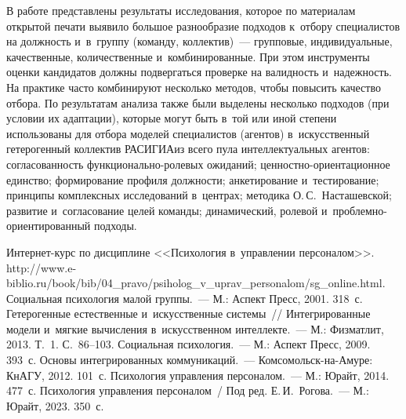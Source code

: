 \begin{multicols}{2}
  В работе представлены результаты исследования, которое по материалам 
открытой печати выявило большое разнообразие подходов к~отбору 
специалистов на долж\-ность и~в~группу (команду, коллектив)~--- групповые, 
индивидуальные, качественные, количественные и~комбинированные. При этом 
инструменты оценки кандидатов должны подвергаться проверке на ва\-лид\-ность
 и~на\-деж\-ность. На практике часто комбинируют несколько методов, чтобы 
повысить качество отбора. По результатам анализа так\-же были выделены 
несколько подходов (при условии их адаптации), которые могут быть в~той или 
иной степени использованы для отбора моделей специалистов (агентов) 
в~искусственный гетерогенный коллектив \mbox{РАСИГИА}\linebreak из всего пула 
интеллектуальных агентов: со\-гла\-со\-ван\-ность функ\-цио\-наль\-но-ро\-ле\-вых 
ожиданий; цен\-ност\-но-ори\-ен\-та\-ци\-он\-ное единство; формирование\linebreak 
профиля долж\-ности; анкетирование и~тес\-ти\-ро\-ва\-ние; принципы комплексных 
исследований в~цент\-рах; методика О.\,С.~На\-ста\-шев\-ской; развитие 
и~согласование целей команды; динамический, \mbox{ролевой} и~проб\-лем\-но-ори\-ен\-ти\-ро\-ван\-ный подходы.
  
{\small\frenchspacing
 {%
 \begin{thebibliography}{99}
 Ин\-тер\-нет-курс по дисциплине <<Психология в~управлении  персоналом>>. 
{\sf   http://www.\linebreak \mbox{e-biblio}.ru/book/bib/04\_pravo/psiholog\_v\_uprav\_\linebreak personalom/sg\_online.html}.
 Социальная психология малой группы.~--- М.: Аспект Пресс, 2001. 318~с.
 Гетерогенные естественные и~искусственные сис\-те\-мы~// 
Интегрированные модели и~мягкие вы\-чис\-ле\-ния в~искусственном интеллекте.~--- М.: Физматлит, 2013. Т.~1. 
С.~86--103.
 Социальная психология.~--- М.: Аспект Пресс, 2009. 393~с.
 Основы интегрированных коммуникаций.~---  
Ком\-со\-мольск-на-Аму\-ре: КнАГУ, 2012. 101~с.
 Психология управления 
персоналом.~--- М.: Юрайт, 2014. 477~с.
Психология управ\-ле\-ния персоналом~/ Под ред. Е.\,И.~Рогова.~--- М.: 
Юрайт, 2023. 350~с.




\end{thebibliography}}}
\end{multicols}
